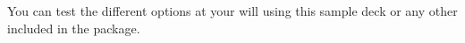 \documentclass[a4paper,10pt]{article}
\begin{document}
\begin{enumerate}
% 
% 

\end{enumerate}

You can test the different options at your will using this sample deck or any
other included in the package.

\newpage
\end{document}
